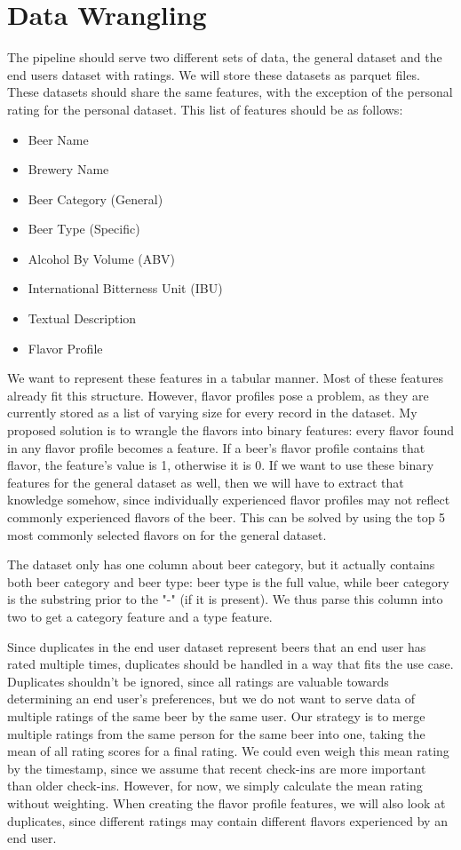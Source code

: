 \documentclass[sigconf]{acmart}
\begin{document}
\section{Data Wrangling}
The pipeline should serve two different sets of data, the general dataset and the end users dataset with ratings.
We will store these datasets as parquet files.
These datasets should share the same features, with the exception of the personal rating for the personal dataset.
This list of features should be as follows:
\begin{itemize}
    \item Beer Name
    \item Brewery Name
    \item Beer Category (General)
    \item Beer Type (Specific)
    \item Alcohol By Volume (ABV)
    \item International Bitterness Unit (IBU)
    \item Textual Description
    \item Flavor Profile
\end{itemize}
We want to represent these features in a tabular manner.
Most of these features already fit this structure.
However, flavor profiles pose a problem, as they are currently stored as a list of varying size for every record in the \citeauthor{untappd} dataset.
My proposed solution is to wrangle the flavors into binary features: every flavor found in any flavor profile becomes a feature.
If a beer's flavor profile contains that flavor, the feature's value is 1, otherwise it is 0.
If we want to use these binary features for the general dataset as well, then we will have to extract that knowledge somehow, since individually experienced flavor profiles may not reflect commonly experienced flavors of the beer.
This can be solved by using the top 5 most commonly selected flavors on \citeauthor{untappd} for the general dataset.

The \citeauthor{untappd} dataset only has one column about beer category, but it actually contains both beer category and beer type: beer type is the full value, while beer category is the substring prior to the "-" (if it is present).
We thus parse this column into two to get a category feature and a type feature.

Since duplicates in the end user dataset represent beers that an end user has rated multiple times, duplicates should be handled in a way that fits the use case.
Duplicates shouldn't be ignored, since all ratings are valuable towards determining an end user's preferences, but we do not want to serve data of multiple ratings of the same beer by the same user.
Our strategy is to merge multiple ratings from the same person for the same beer into one, taking the mean of all rating scores for a final rating.
We could even weigh this mean rating by the timestamp, since we assume that recent check-ins are more important than older check-ins.
However, for now, we simply calculate the mean rating without weighting.
When creating the flavor profile features, we will also look at duplicates, since different ratings may contain different flavors experienced by an end user.
\end{document}
